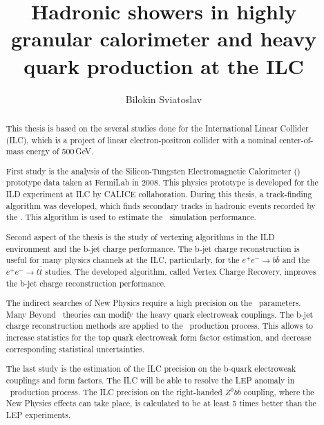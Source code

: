 \documentclass[a4paper]{article}
\title{Hadronic showers in highly granular calorimeter and heavy quark production at the ILC}
\author{Bilokin Sviatoslav}
\begin{document}
\maketitle
\begin{abstract}
This thesis is based on the several studies done for the International Linear Collider (ILC), which is a project of linear electron-positron collider with a nominal center-of-mass energy of 500\,GeV.

First study is the analysis of the Silicon-Tungsten Electromagnetic Calorimeter (\ecal) prototype data taken at FermiLab in 2008. This physics prototype is developed for the ILD experiment at ILC by CALICE collaboration. During this thesis, a track-finding algorithm was developed, which finds secondary tracks in hadronic events recorded by the \ecalp. This algorithm is used to estimate the \geant\ simulation performance. 

Second aspect of the thesis is the study of vertexing algorithms in the ILD environment and the b-jet charge performance. The b-jet charge reconstruction is useful for many physics channels at the ILC, particularly, for the $e^+e^-\to b\bar{b}$ and the $e^+e^-\to t\bar{t}$ studies. 
The developed algorithm, called Vertex Charge Recovery, improves the b-jet charge reconstruction performance. 

The indirect searches of New Physics require a high precision on the \sm\ parameters. Many Beyond \sm\ theories can modify the heavy quark electroweak couplings. 
The b-jet charge reconstruction methods are applied to the \ttbar\ production process. This allows to increase statistics for the top quark electroweak form factor estimation, and decrease corresponding statistical uncertainties.

The last study is the estimation of the ILC precision on the b-quark electroweak couplings and form factors. The ILC will be able to resolve the LEP anomaly in \bbbar\ production process. The ILC precision on the right-handed $Z^0b\bar{b}$ coupling, where the New Physics effects can take place, is calculated to be at least 5 times better than the LEP experiments. 
\end{abstract}
\tableofcontents
\linenumbers
%
%
%
%
\newpage
\end{document}
